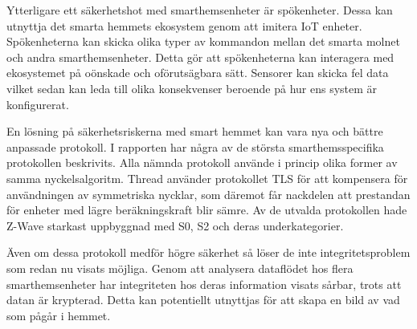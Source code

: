 \documentclass[conference]{IEEEtran}
\begin{document}
Ytterligare ett säkerhetshot med smarthemsenheter är spökenheter. Dessa kan utnyttja det smarta hemmets ekosystem genom att imitera IoT enheter. Spökenheterna kan skicka olika typer av kommandon mellan det smarta molnet och andra smarthemsenheter. Detta gör att spökenheterna kan interagera med ekosystemet på oönskade och oförutsägbara sätt. Sensorer kan skicka fel data vilket sedan kan leda till olika konsekvenser beroende på hur ens system är konfigurerat.

En lösning på säkerhetsriskerna med smart hemmet kan vara nya och bättre anpassade protokoll. I rapporten har några av de största smarthemsspecifika protokollen beskrivits. Alla nämnda protokoll använde i princip olika former av samma nyckelsalgoritm. Thread använder protokollet TLS för att kompensera för användningen av symmetriska nycklar, som däremot får nackdelen att prestandan för enheter med lägre beräkningskraft blir sämre. Av de utvalda protokollen hade Z-Wave starkast uppbyggnad med S0, S2 och deras underkategorier. 

Även om dessa protokoll medför högre säkerhet så löser de inte integritetsproblem som redan nu visats möjliga. Genom att analysera dataflödet hos flera smarthemsenheter har integriteten hos deras information visats sårbar, trots att datan är krypterad. Detta kan potentiellt utnyttjas för att skapa en bild av vad som pågår i hemmet. 



%
%
\end{document}
